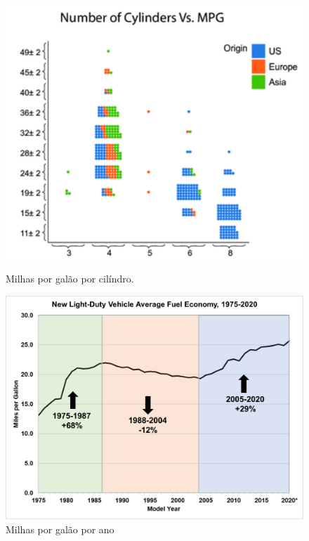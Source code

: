 \documentclass{report}
\begin{document}
\begin{figure}[h!]
    \centering
    \begin{minipage}[b]{0.45\textwidth}
        \centering
        \includegraphics[width=\linewidth]{images/plots/independent/MPGbyCylinders.png} 
        \caption{\centering Milhas por galão por cilíndro.}
        \label{fig: MPGpCylinder}
    \end{minipage} \hfill
    \begin{minipage}[b]{0.45\textwidth}
        \centering
        \includegraphics[width=\linewidth]{images/plots/independent/MPGbyYear.png}
        \caption{\centering Milhas por galão por ano}
        \label{fig: MPGbyYear}
    \end{minipage}
\end{figure}
\end{document}
